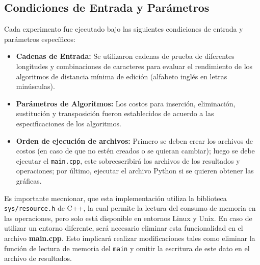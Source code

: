 \subsection*{Condiciones de Entrada y Parámetros}

Cada experimento fue ejecutado bajo las siguientes condiciones de entrada y parámetros específicos:
\begin{itemize}
    \item \textbf{Cadenas de Entrada:} Se utilizaron cadenas de prueba de diferentes longitudes y combinaciones de caracteres para evaluar el rendimiento de los algoritmos de distancia mínima de edición (alfabeto inglés en letras minúsculas). 
    \item \textbf{Parámetros de Algoritmos:} Los costos para inserción, eliminación, sustitución y transposición fueron establecidos de acuerdo a las especificaciones de los algoritmos.
    \item \textbf{Orden de ejecución de archivos:} Primero se deben crear los archivos de costos (en caso de que no estén creados o se quieran cambiar); luego se debe ejecutar el \verb|main.cpp|, este sobreescribirá los archivos de los resultados y operaciones; por último, ejecutar el archivo Python si se quieren obtener las gráficas.
\end{itemize}

Es importante mecnionar, que esta implementación utiliza la biblioteca \texttt{sys/resource.h} de C++, la cual permite la lectura del consumo de memoria en las operaciones, pero solo está disponible en entornos Linux y Unix. En caso de utilizar un entorno diferente, será necesario eliminar esta funcionalidad en el archivo \textbf{main.cpp}. Esto implicará realizar modificaciones tales como eliminar la función de lectura de memoria del \texttt{main} y omitir la escritura de este dato en el archivo de resultados.



